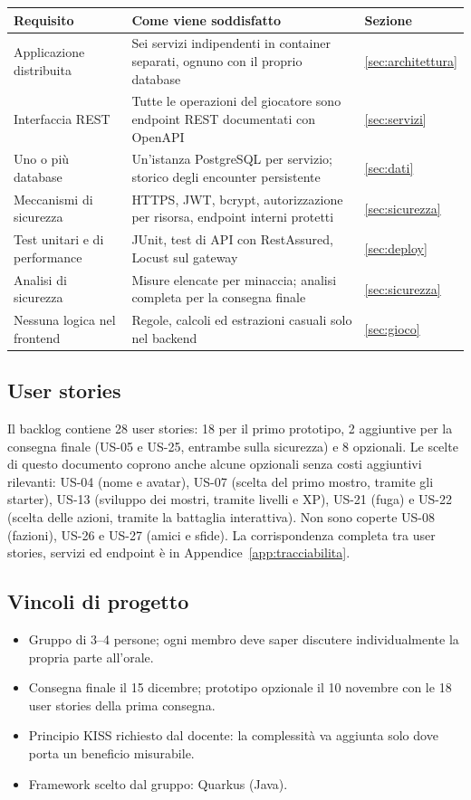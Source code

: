 \documentclass[11pt,a4paper]{article}
\begin{document}
\begin{tabularx}{\linewidth}{@{}L{3.6cm}YL{2.2cm}@{}}
  \toprule
  Requisito & Come viene soddisfatto & Sezione \\
  \midrule
  Applicazione distribuita & Sei servizi indipendenti in container separati, ognuno con il proprio database & \ref{sec:architettura} \\
  Interfaccia REST & Tutte le operazioni del giocatore sono endpoint REST documentati con OpenAPI & \ref{sec:servizi} \\
  Uno o più database & Un'istanza PostgreSQL per servizio; storico degli encounter persistente & \ref{sec:dati} \\
  Meccanismi di sicurezza & HTTPS, JWT, bcrypt, autorizzazione per risorsa, endpoint interni protetti & \ref{sec:sicurezza} \\
  Test unitari e di performance & JUnit, test di API con RestAssured, Locust sul gateway & \ref{sec:deploy} \\
  Analisi di sicurezza & Misure elencate per minaccia; analisi completa per la consegna finale & \ref{sec:sicurezza} \\
  Nessuna logica nel frontend & Regole, calcoli ed estrazioni casuali solo nel backend & \ref{sec:gioco} \\
  \bottomrule
\end{tabularx}

\subsection{User stories}

Il backlog contiene 28 user stories: 18 per il primo prototipo, 2 aggiuntive per la consegna finale (US-05 e US-25, entrambe sulla sicurezza) e 8 opzionali. Le scelte di questo documento coprono anche alcune opzionali senza costi aggiuntivi rilevanti: US-04 (nome e avatar), US-07 (scelta del primo mostro, tramite gli starter), US-13 (sviluppo dei mostri, tramite livelli e XP), US-21 (fuga) e US-22 (scelta delle azioni, tramite la battaglia interattiva). Non sono coperte US-08 (fazioni), US-26 e US-27 (amici e sfide). La corrispondenza completa tra user stories, servizi ed endpoint è in Appendice~\ref{app:tracciabilita}.

\subsection{Vincoli di progetto}

\begin{itemize}
  \item Gruppo di 3–4 persone; ogni membro deve saper discutere individualmente la propria parte all'orale.
  \item Consegna finale il 15 dicembre; prototipo opzionale il 10 novembre con le 18 user stories della prima consegna.
  \item Principio KISS richiesto dal docente: la complessità va aggiunta solo dove porta un beneficio misurabile.
  \item Framework scelto dal gruppo: Quarkus (Java).
\end{itemize}
\end{document}
